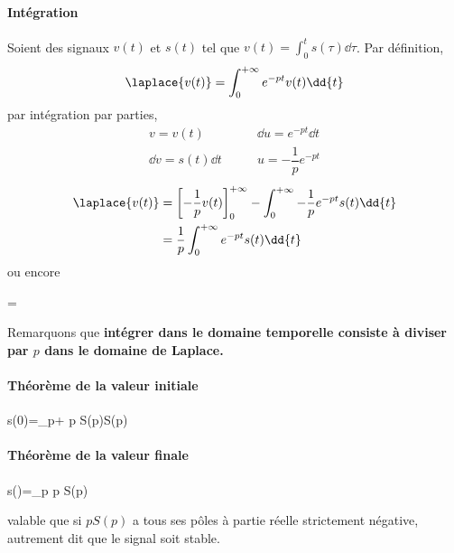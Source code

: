 \paragraph{Intégration}
Soient  des signaux $v(t)$ et $s(t)$ tel que $v(t)=\int_{0}^{t}s(\tau)\dd{\tau}$. 
Par définition,
$$
\laplace{v(t)}=\int_{0}^{+\infty} e^{-pt}v(t)\dd{t}
$$
par intégration par parties,
\begin{align*}
    v=v(t)\qquad&\dd{u}=e^{-pt}\dd{t}\\
    \dd{v}=s(t)\dd{t}\qquad&u=-\dfrac{1}{p}e^{-pt}
\end{align*} 
\begin{align*}
    \laplace{v(t)}&=\left[-\dfrac{1}{p}v(t)\right]_0^{+\infty}-\int_{0}^{+\infty} -\dfrac{1}{p}e^{-pt}s(t)\dd{t} \\
    &=\dfrac{1}{p}\int_{0}^{+\infty} e^{-pt}s(t)\dd{t}       
\end{align*}
ou encore
\begin{bequation}
    =
\end{bequation}
Remarquons que \textbf{intégrer dans le domaine temporelle consiste à diviser par $p$ 
dans le domaine de Laplace.}


\paragraph{Théorème de la valeur initiale}
\begin{bequation}
    s(0)=\lim\limits_{p\rightarrow+\infty} p S(p)\qquad \forall S(p)
\end{bequation}

\paragraph{Théorème de la valeur finale}
\begin{bequation}
    s(\infty)=\lim\limits_{p} p S(p)
\end{bequation}
valable que si $pS(p)$ a tous ses pôles à partie réelle strictement négative, autrement dit que le
signal soit stable.


